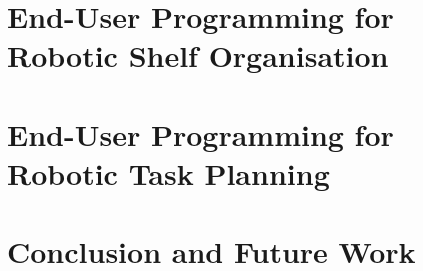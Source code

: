 \documentclass[a4paper,12pt,twoside,openany]{book}
\theoremstyle{definition}
\theoremstyle{remark}
\begin{document}
\chapter{End-User Programming for Robotic Shelf Organisation}\label{chap:OrganisingTasks}
\minitoc%


\chapter{End-User Programming for Robotic Task Planning}\label{chap:Implementation}
\minitoc%





\chapter{Conclusion and Future Work}\label{chap:Conclusion}
\minitoc%



\clearpage


\appendix

\end{document}

